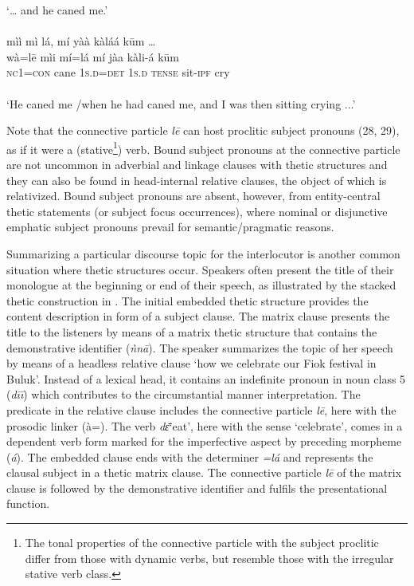 \documentclass[output=paper]{langsci/langscibook}
\begin{document}
\ea\label{ex:schwarz:29}
‘… and he caned me.’\\
 \textup{   } \\
  mìì  {mì   lá}, mí    yàà  kàláá    k\={u}m …\\
  \textup{wà=l\={e}}  mìi  mí=lá \textup{mí}    jàa  kàli-á    k\={u}m\\
     \textsc{nc}1=\textsc{con} cane  1\textsc{s}.\textsc{d}=\textsc{det} 1\textsc{s}.\textsc{d}  \textsc{tense}  sit-\textsc{ipf}    cry\\
     \textup{ } \\       
\glt ‘He caned me /when he had caned me, and I was then sitting crying ...’
\z

Note that the connective particle \textit{l\={e}} can host proclitic subject pronouns (28, 29), as if it were a (stative\footnote{The tonal properties of the connective particle with the subject proclitic differ from those with dynamic verbs, but resemble those with the irregular stative verb class.}) verb. Bound subject pronouns at the connective particle are not uncommon in adverbial and linkage clauses with thetic structures and they can also be found in head-internal relative clauses, the object of which is relativized. Bound subject pronouns are absent, however, from entity-central thetic statements (or subject focus occurrences), where nominal or disjunctive emphatic subject pronouns prevail for semantic/pragmatic reasons.

Summarizing a particular discourse topic for the interlocutor is another common situation where thetic structures occur. Speakers often present the title of their monologue at the beginning or end of their speech, as illustrated by the stacked thetic construction in . The initial embedded thetic structure provides the content description in form of a subject clause. The matrix clause presents the title to the listeners by means of a matrix thetic structure that contains the demonstrative identifier (\textit{ǹn\={a}}). The speaker summarizes the topic of her speech by means of a headless relative clause ‘how we celebrate our Fiok festival in Buluk’. Instead of a lexical head, it contains an indefinite pronoun in noun class 5 (\textit{d\={i}\={i}}) which contributes to the circumstantial manner interpretation. The predicate in the relative clause includes the connective particle \textit{l\={e}}, here with the prosodic linker (à=). The verb \textit{d\={ɛ}}‘eat’, here with the sense ‘celebrate’, comes in a dependent verb form marked for the imperfective aspect by preceding morpheme (\textit{á}). The embedded clause ends with the determiner \textit{=lá} and represents the clausal subject in a thetic matrix clause. The connective particle \textit{l\={e}} of the matrix clause is followed by the demonstrative identifier and fulfils the presentational function.
\end{document}
